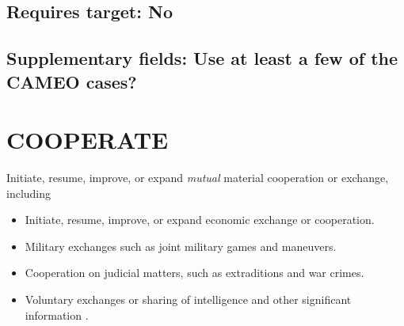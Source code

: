 \documentclass[11pt]{report}
\newcommand{\ti}[1]{\textit{#1}}
\begin{document}

\subsection{Requires target: No}

\subsection{Supplementary fields: Use at least a few of the CAMEO cases?}


\bigskip

\section{COOPERATE}

Initiate, resume, improve, or expand \ti{mutual} material cooperation or exchange, including

\begin{itemize}
\item Initiate, resume, improve, or expand economic exchange or cooperation.

\item Military exchanges such as joint military games and maneuvers.

\item Cooperation on judicial matters, such as extraditions and war crimes.

\item Voluntary exchanges or sharing of intelligence and other significant information .

\end{itemize}
\end{document}
